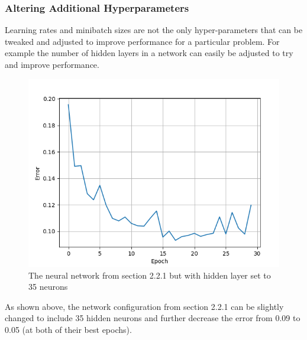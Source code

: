 \documentclass{article}
\begin{document}
\subsubsection{Altering Additional Hyperparameters}
Learning rates and minibatch sizes are not the only hyper-parameters that can be tweaked and adjusted to improve performance for a particular problem. For example the number of hidden layers in a network can easily be adjusted to try and improve performance.

\begin{figure}[!htb]
\centering
	\includegraphics[scale=0.6]{hyper.png}
\caption{The neural network from section 2.2.1 but with hidden layer set to 35 neurons}
\end{figure}

As shown above, the network configuration from section 2.2.1 can be slightly changed to include 35 hidden neurons and further decrease the error from 0.09 to 0.05 (at both of their best epochs). 
\end{document}
